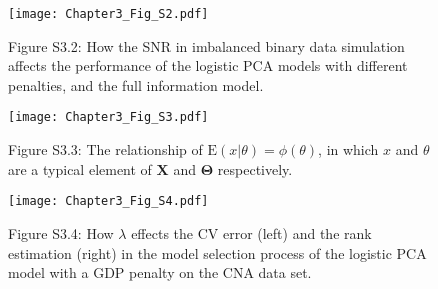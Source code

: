\begin{figure}[htbp]
    \centering
    \texttt{[image: Chapter3\_Fig\_S2.pdf]}
    \caption*{Figure S3.2: How the SNR in imbalanced binary data simulation affects the performance of the logistic PCA models with different penalties, and the full information model.}
    \label{chapter3_fig:S2}
\end{figure}

\begin{figure}[htbp]
    \centering
    \texttt{[image: Chapter3\_Fig\_S3.pdf]}
    \caption*{Figure S3.3: The relationship of $\text{E}(x|\theta) = \phi(\theta)$, in which $x$ and $\theta$ are a typical element of $\mathbf{X}$ and $\mathbf{\Theta}$ respectively.}
    \label{chapter3_fig:S3}
\end{figure}

\begin{figure}[htbp]
    \centering
    \texttt{[image: Chapter3\_Fig\_S4.pdf]}
    \caption*{Figure S3.4: How $\lambda$ effects the CV error (left) and the rank estimation (right) in the model selection process of the logistic PCA model with a GDP penalty on the CNA data set.}
    \label{chapter3_fig:S4}
\end{figure}








